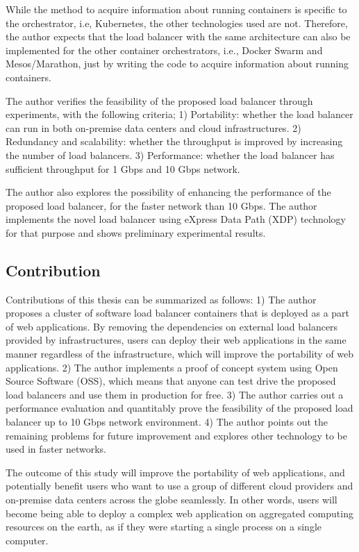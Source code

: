 While the method to acquire information about running containers is specific to the orchestrator, i.e, Kubernetes, the other technologies used are not.
Therefore, the author expects that the load balancer with the same architecture can also be implemented for the other container orchestrators, i.e., Docker Swarm and Mesos/Marathon, just by writing the code to acquire information about running containers.



The author verifies the feasibility of the proposed load balancer through experiments, with the following criteria;
1) Portability: whether the load balancer can run in both on-premise data centers and cloud infrastructures.
2) Redundancy and scalability: whether the throughput is improved by increasing the number of load balancers.
3) Performance: whether the load balancer has sufficient throughput for 1 Gbps and 10 Gbps network.



The author also explores the possibility of enhancing the performance of the proposed load balancer, for the faster network than 10 Gbps.
The author implements the novel load balancer using eXpress Data Path (XDP) technology \cite{bertin2017xdp} for that purpose and shows preliminary experimental results.


\FloatBarrier

\subsection{Contribution}

Contributions of this thesis can be summarized as follows:
1) The author proposes a cluster of software load balancer containers that is deployed as a part of web applications.
By removing the dependencies on external load balancers provided by infrastructures, users can deploy their web applications in the same manner regardless of the infrastructure, which will improve the portability of web applications.
2) The author implements a proof of concept system using Open Source Software (OSS), which means that anyone can test drive the proposed load balancers and use them in production for free.
3) 
The author carries out a performance evaluation and quantitably prove the feasibility of the proposed load balancer up to 10 Gbps network environment.
4) The author points out the remaining problems for future improvement and explores other technology to be used in faster networks.

The outcome of this study will improve the portability of web applications, and potentially benefit users who want to use a group of different cloud providers and on-premise data centers across the globe seamlessly.
In other words, users will become being able to deploy a complex web application on aggregated computing resources on the earth, as if they were starting a single process on a single computer.

